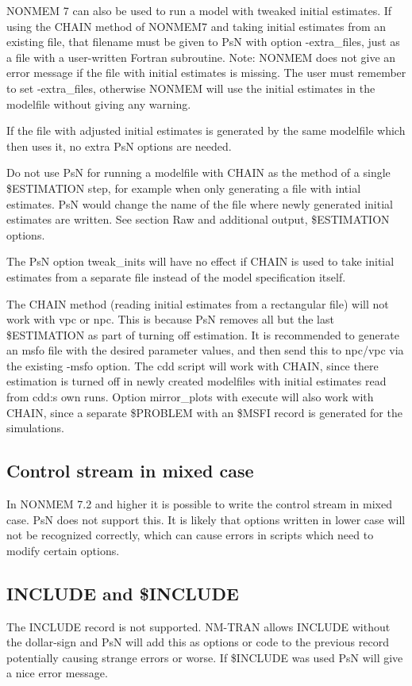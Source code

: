 NONMEM 7 can also be used to run a model with tweaked initial estimates. If using the CHAIN method of NONMEM7 and taking initial estimates from an existing file, that filename must be given to PsN with option -extra\_files, just as a file with a user-written Fortran subroutine. Note: NONMEM does not give an error message if the file with initial estimates is missing. The user must remember to set -extra\_files, otherwise NONMEM will use the initial estimates in the modelfile without giving any warning.

If the file with adjusted initial estimates is generated by the same modelfile which then uses it, no extra PsN options are needed.

Do not use PsN for running a modelfile with CHAIN as the method of a single \$ESTIMATION step, for example when only generating a file with intial estimates. PsN would change the name of the file where newly generated initial estimates are written. See section Raw and additional output, \$ESTIMATION options.

The PsN option tweak\_inits will have no effect if CHAIN is used to take initial estimates from a separate file instead of the model specification itself.

The CHAIN method (reading initial estimates from a rectangular file) will not work with vpc or npc. This is because PsN removes all but the last \$ESTIMATION as part of turning off estimation. It is recommended to generate an msfo file with the desired parameter values, and then send this to npc/vpc via the existing -msfo option. The cdd script will work with CHAIN, since there estimation is turned off in newly created modelfiles with initial estimates read from cdd:s own runs. Option mirror\_plots with execute will also work with CHAIN, since a separate \$PROBLEM with an \$MSFI record is generated for the simulations.

\subsection{Control stream in mixed case}
In NONMEM 7.2 and higher it is possible to write the control stream in mixed case. PsN does not support this. It is likely that options written in lower case will not be recognized correctly, which can cause errors in scripts which
need to modify certain options.

\subsection{INCLUDE and \$INCLUDE}
The INCLUDE record is not supported. NM-TRAN allows INCLUDE without the dollar-sign and PsN will add this as options or code to the previous record potentially causing strange errors or worse. If \$INCLUDE was used PsN will give a nice error message.

